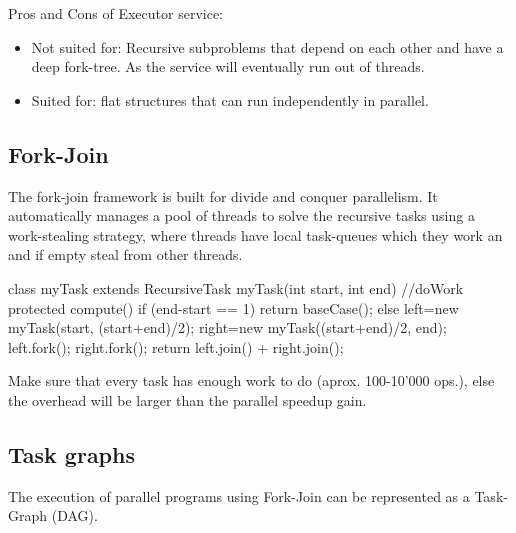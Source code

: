             Pros and Cons of Executor service:
            \begin{itemize}
    \item Not suited for: Recursive subproblems that depend on each other and have a deep fork-tree. As the
                    service will eventually run out of threads.
    \item Suited for: flat structures that can run independently in parallel.
\end{itemize}

\subsection{Fork-Join}

            The fork-join framework is built for divide and conquer parallelism. It automatically manages a pool of
            threads to solve the recursive tasks using a work-stealing strategy, where threads have local task-queues
            which they work an and if empty steal from other threads.

            \begin{codeexample}

                class myTask extends RecursiveTask {
                myTask(int start, int end) {
                //doWork
                }
                protected compute() {
                if (end-start == 1) { return baseCase();} } else { left=new myTask(start, (start+end)/2);
                right=new myTask((start+end)/2, end); left.fork(); right.fork(); return left.join() + right.join();
                } }
            
\end{codeexample}

\begin{important}

                Make sure that every task has enough work to do (aprox. 100-10'000 ops.), else the overhead will be
                larger than the parallel
                speedup gain.
            
\end{important}

\subsection{Task graphs}

            The execution of parallel programs using Fork-Join can be represented as a Task-Graph (DAG).

